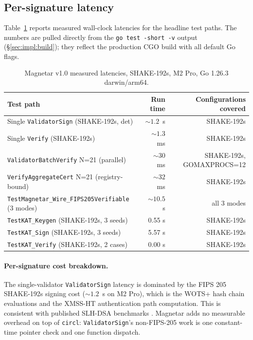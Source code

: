 \subsection{Per-signature latency}
\label{sec:eval:latency}

Table~\ref{tab:eval-latency} reports measured wall-clock latencies
for the headline test paths. The numbers are pulled directly from
the \texttt{go test -short -v} output (\S\ref{sec:impl:build}); they
reflect the production CGO build with all default Go flags.

\begin{table}[H]
\centering
\caption{Magnetar v1.0 measured latencies, SHAKE-192s, M2 Pro,
Go 1.26.3 darwin/arm64.}
\label{tab:eval-latency}
\begin{tabular}{lrr}
\toprule
Test path & Run time & Configurations covered \\
\midrule
Single \texttt{ValidatorSign} (SHAKE-192s, det) & $\sim 1.2$~s & SHAKE-192s \\
Single \texttt{Verify} (SHAKE-192s) & $\sim 1.3$~ms & SHAKE-192s \\
\texttt{ValidatorBatchVerify} N=21 (parallel) & $\sim 30$~ms & SHAKE-192s, GOMAXPROCS=12 \\
\texttt{VerifyAggregateCert} N=21 (registry-bound) & $\sim 32$~ms & SHAKE-192s \\
\texttt{TestMagnetar\_Wire\_FIPS205Verifiable} (3 modes) & $\sim 10.5$~s & all 3 modes \\
\texttt{TestKAT\_Keygen} (SHAKE-192s, 3 seeds) & 0.55 s & SHAKE-192s \\
\texttt{TestKAT\_Sign} (SHAKE-192s, 3 seeds) & 5.57 s & SHAKE-192s \\
\texttt{TestKAT\_Verify} (SHAKE-192s, 2 cases) & 0.00 s & SHAKE-192s \\
\bottomrule
\end{tabular}
\end{table}

\paragraph{Per-signature cost breakdown.}
The single-validator \texttt{ValidatorSign} latency is dominated
by the FIPS 205 SHAKE-192s signing cost ($\sim 1.2$~s on M2 Pro),
which is the WOTS+ hash chain evaluations and the XMSS-HT
authentication path computation. This is consistent with published
SLH-DSA benchmarks \cite{sphincs}. Magnetar adds no measurable
overhead on top of \texttt{circl}: \texttt{ValidatorSign}'s
non-FIPS-205 work is one constant-time pointer check and one
function dispatch.

